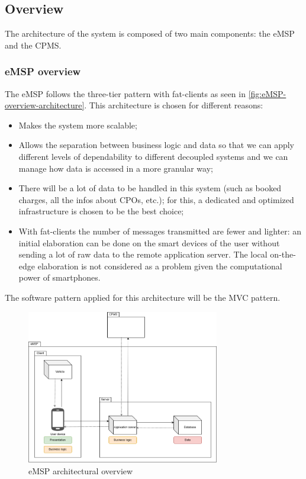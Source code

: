 
\subsection{Overview}
The architecture of the system is composed of two main components: the \ac{eMSP} and the \ac{CPMS}.

\subsubsection{\ac{eMSP} overview}
The \ac{eMSP} follows the three-tier pattern with fat-clients as seen in \autoref{fig:eMSP-overview-architecture}. This architecture is chosen for different reasons:
\begin{itemize}
    \item Makes the system more scalable;
    \item Allows the separation between business logic and data so that we can apply different levels of dependability to different decoupled systems and we can manage how data is accessed in a more granular way;
    \item There will be a lot of data to be handled in this system (such as booked charges, all the infos about \acp{CPO}, etc.); for this, a dedicated and optimized infrastructure is chosen to be the best choice;
    \item With fat-clients the number of messages transmitted are fewer and lighter: an initial elaboration can be done on the smart devices of the user without sending a lot of raw data to the remote application server. The local on-the-edge elaboration is not considered as a problem given the computational power of smartphones.
\end{itemize}
The software pattern applied for this architecture will be the \ac{MVC} pattern.
\begin{figure}[!h]
    \begin{center}
        \includegraphics[keepaspectratio, width=0.75\textwidth]{Graphics/DD-overview-eMSP.drawio.png}
        \caption{\ac{eMSP} architectural overview}
        \label{fig:eMSP-overview-architecture}
    \end{center}
\end{figure}

